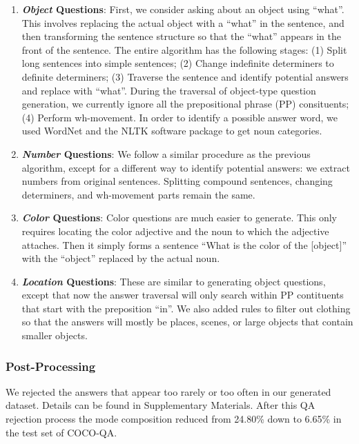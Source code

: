 \documentclass{article} %
\renewcommand{\#}[1]{\textbf{#1}}
\begin{document}
\begin{enumerate}[leftmargin=*]

\item \textbf{{\it Object} Questions}: First, we consider asking about an
object using ``what''. This involves replacing the actual object with a
``what'' in the sentence, and then transforming the sentence structure so that
the ``what'' appears in the front of the sentence. The entire algorithm has the
following stages: (1) Split long sentences into simple sentences; (2) Change
indefinite determiners to definite determiners; (3) Traverse the sentence and
identify potential answers and replace with ``what''. During the traversal of
object-type question generation, we currently ignore all the prepositional
phrase (PP) consituents; (4) Perform wh-movement. In order to identify a
possible answer word, we used WordNet \cite{wordnet} and the NLTK software
package \cite{nltk} to get noun categories.

\item \textbf{{\it Number} Questions}: We follow a similar procedure as the
previous algorithm, except for a different way to identify potential answers:
we extract numbers from original sentences. Splitting compound sentences,
changing determiners, and wh-movement parts remain the same.

\item \textbf{{\it Color} Questions}: Color questions are much easier to
generate. This only requires locating the color adjective and the noun to which
the adjective attaches. Then it simply forms a sentence ``What is the color of
the [object]'' with the ``object'' replaced by the actual noun.

\item \textbf{{\it Location} Questions}: These are similar to generating object
questions, except that now the answer traversal will only search within PP
contituents that start with the preposition ``in''. We also added rules to
filter out clothing so that the answers will mostly be places, scenes, or large
objects that contain smaller objects.

\end{enumerate}

\subsubsection{Post-Processing}

We rejected the answers that appear too rarely or too often in our generated
dataset. Details can be found in Supplementary Materials. After this QA
rejection process the mode composition reduced from 24.80\% down to 6.65\% in
the test set of COCO-QA.
\end{document}
